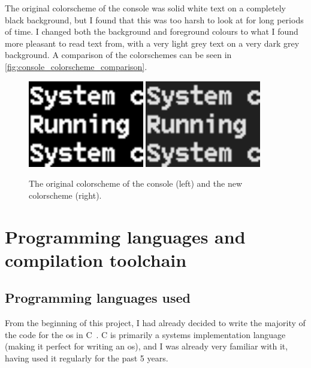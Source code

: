 \documentclass{article}
\begin{document}
The original colorscheme of the console was solid white text on a completely
black background, but I found that this was too harsh to look at for long
periods of time. I changed both the background and foreground colours to what I
found more pleasant to read text from, with a very light grey text on a very
dark grey background. A comparison of the colorschemes can be seen in
\autoref{fig:console_colorscheme_comparison}.

\begin{figure}[htpb]
    \centering
    \includegraphics[width=0.45\textwidth]{figure/black.png}
    \includegraphics[width=0.45\textwidth]{figure/grey.png}
    \caption{The original colorscheme of the console (left) and the new
    colorscheme (right).}
    \label{fig:console_colorscheme_comparison}
\end{figure}

\section{Programming languages and compilation toolchain}
\subsection{Programming languages used}
From the beginning of this project, I had already decided to write the majority
of the code for the \gls{os} in C~\cite{c-programming-language}. C is primarily
a systems implementation language (making it perfect for writing an \gls{os}),
and I was already very familiar with it, having used it regularly for the past
5 years.
\end{document}
